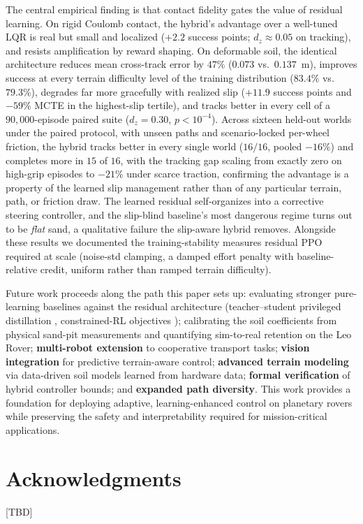 \documentclass[conference]{IEEEtran}
\begin{document}
The central empirical finding is that contact fidelity gates the value of residual learning. On rigid Coulomb contact, the hybrid's advantage over a well-tuned LQR is real but small and localized ($+2.2$ success points; $d_z \approx 0.05$ on tracking), and resists amplification by reward shaping. On deformable soil, the identical architecture reduces mean cross-track error by $47\%$ ($0.073$ vs.\ $0.137$~m), improves success at every terrain difficulty level of the training distribution ($83.4\%$ vs.\ $79.3\%$), degrades far more gracefully with realized slip ($+11.9$ success points and $-59\%$ MCTE in the highest-slip tertile), and tracks better in every cell of a $90{,}000$-episode paired suite ($d_z = 0.30$, $p < 10^{-4}$). Across sixteen held-out worlds under the paired protocol, with unseen paths and scenario-locked per-wheel friction, the hybrid tracks better in every single world ($16/16$, pooled $-16\%$) and completes more in $15$ of $16$, with the tracking gap scaling from exactly zero on high-grip episodes to $-21\%$ under scarce traction, confirming the advantage is a property of the learned slip management rather than of any particular terrain, path, or friction draw. The learned residual self-organizes into a corrective steering controller, and the slip-blind baseline's most dangerous regime turns out to be \emph{flat} sand, a qualitative failure the slip-aware hybrid removes. Alongside these results we documented the training-stability measures residual PPO required at scale (noise-std clamping, a damped effort penalty with baseline-relative credit, uniform rather than ramped terrain difficulty).

Future work proceeds along the path this paper sets up: evaluating stronger pure-learning baselines against the residual architecture (teacher--student privileged distillation \cite{choi2023deformable}, constrained-RL objectives \cite{achiam2017cpo}); calibrating the soil coefficients from physical sand-pit measurements and quantifying sim-to-real retention on the Leo Rover; \textbf{multi-robot extension} to cooperative transport tasks; \textbf{vision integration} for predictive terrain-aware control; \textbf{advanced terrain modeling} via data-driven soil models learned from hardware data; \textbf{formal verification} of hybrid controller bounds; and \textbf{expanded path diversity}. This work provides a foundation for deploying adaptive, learning-enhanced control on planetary rovers while preserving the safety and interpretability required for mission-critical applications.

\section*{Acknowledgments}
[TBD]



\end{document}
